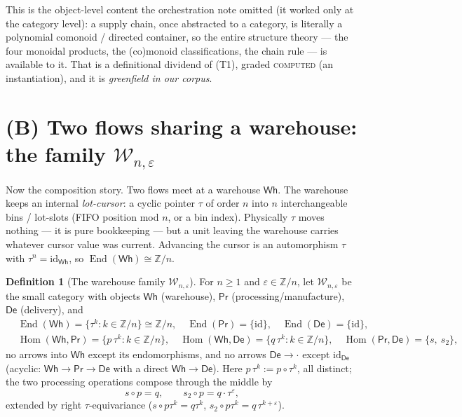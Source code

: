 \documentclass[11pt]{article}
\theoremstyle{definition}
\newtheorem{definition}[theorem]{Definition}
\newcommand{\Hom}{\operatorname{Hom}}
\newcommand{\End}{\operatorname{End}}
\newcommand{\id}{\mathrm{id}}
\newcommand{\W}{\mathcal{W}}
\newcommand{\Wh}{\mathsf{Wh}}
\newcommand{\Prc}{\mathsf{Pr}}
\newcommand{\De}{\mathsf{De}}
\newcommand{\Zn}{\mathbb{Z}/n}
\begin{document}
This is the object-level content the orchestration note omitted (it worked only at the
category level): a supply chain, once abstracted to a category, is literally a
polynomial comonoid / directed container, so the entire structure theory --- the four
monoidal products, the (co)monoid classifications, the chain rule --- is available to
it. That is a definitional dividend of (T1), graded \textsc{computed} (an
instantiation), and it is \emph{greenfield in our corpus}.

\section{(B) Two flows sharing a warehouse: the family $\W_{n,\varepsilon}$}
\label{sec:warehouse}

Now the composition story. Two flows meet at a warehouse $\Wh$. The warehouse keeps
an internal \emph{lot-cursor}: a cyclic pointer $\tau$ of order $n$ into $n$
interchangeable bins / lot-slots (FIFO position mod $n$, or a bin index). Physically
$\tau$ moves nothing --- it is pure bookkeeping --- but a unit leaving the warehouse
carries whatever cursor value was current. Advancing the cursor is an automorphism
$\tau$ with $\tau^n=\id_\Wh$, so $\End(\Wh)\cong\Zn$.

\begin{definition}[The warehouse family $\W_{n,\varepsilon}$]\label{def:Wne}
For $n\ge1$ and $\varepsilon\in\Zn$, let $\W_{n,\varepsilon}$ be the small category with
objects $\Wh$ (warehouse), $\Prc$ (processing/manufacture), $\De$ (delivery), and
\[
\begin{aligned}
&\End(\Wh)=\{\tau^k:k\in\Zn\}\cong\Zn,\quad \End(\Prc)=\{\id\},\quad \End(\De)=\{\id\},\\
&\Hom(\Wh,\Prc)=\{p\,\tau^k:k\in\Zn\},\quad
 \Hom(\Wh,\De)=\{q\,\tau^k:k\in\Zn\},\quad
 \Hom(\Prc,\De)=\{s,\ s_2\},
\end{aligned}
\]
no arrows into $\Wh$ except its endomorphisms, and no arrows $\De\to\cdot$ except
$\id_\De$ (acyclic: $\Wh\to\Prc\to\De$ with a direct $\Wh\to\De$). Here
$p\,\tau^k:=p\circ\tau^k$, all distinct; the two processing operations compose through
the middle by
\[
   s\circ p=q,\qquad s_2\circ p=q\cdot\tau^{\varepsilon},
\]
extended by right $\tau$-equivariance ($s\circ p\tau^k=q\tau^k$,
$s_2\circ p\tau^k=q\,\tau^{k+\varepsilon}$).
\end{definition}
\end{document}
